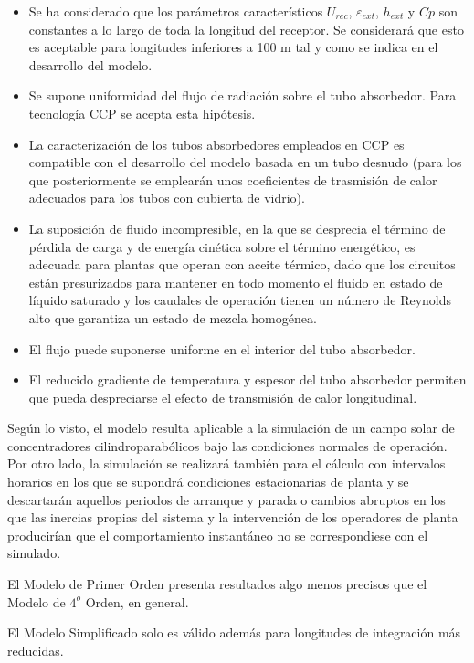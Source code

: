 \begin{itemize}
\item
Se ha considerado que los parámetros característicos \(U_{rec}\), \(\varepsilon_{ext}\), \(h_{ext}\) y \(Cp\) son constantes a lo largo de toda la longitud del receptor. Se considerará que esto es aceptable para longitudes inferiores a 100 m tal y como se indica en el desarrollo del modelo. 
\item Se supone uniformidad del flujo de radiación sobre el tubo absorbedor. Para tecnología CCP se acepta esta hipótesis. 
\item La caracterización de los tubos absorbedores empleados en CCP es compatible con el desarrollo del modelo basada en un tubo desnudo (para los que posteriormente se emplearán unos coeficientes de trasmisión de calor adecuados para los tubos con cubierta de vidrio). 
\item La suposición de fluido incompresible, en la que se desprecia el término de pérdida de carga y de energía cinética sobre el término energético, es adecuada para plantas que operan con aceite térmico,  dado que los circuitos están presurizados para mantener en todo momento el fluido en estado de líquido saturado y los caudales de operación tienen un número de Reynolds alto que garantiza un estado de mezcla homogénea. 
\item El flujo puede suponerse uniforme en el interior del tubo absorbedor. 
\item El reducido gradiente de temperatura y espesor del tubo absorbedor permiten que pueda despreciarse el efecto de transmisión de calor longitudinal. 
\end{itemize}

Según lo visto, el modelo resulta aplicable a la simulación de un campo solar de concentradores cilindroparabólicos bajo las condiciones normales de operación. Por otro lado, la simulación se realizará también para el cálculo con intervalos horarios en los que se supondrá condiciones estacionarias de planta y se descartarán aquellos periodos de arranque y parada o cambios abruptos en los que las inercias propias del sistema y la intervención de los operadores de planta producirían que el comportamiento instantáneo no se correspondiese con el simulado.

El Modelo de Primer Orden presenta resultados algo menos precisos que el Modelo de $4^o$ Orden, en general.

El Modelo Simplificado solo es válido además para longitudes de integración más reducidas.
